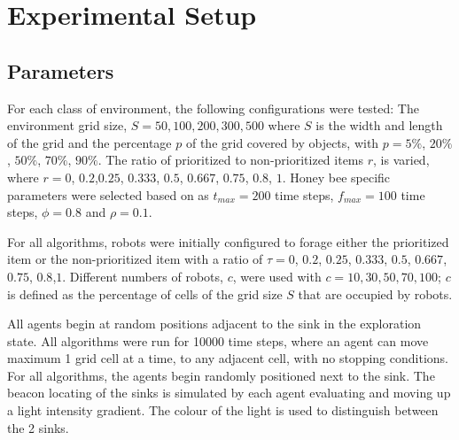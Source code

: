 
\chapter{Experimental Setup}
\label{chap:third}




\section{Parameters}
\label{parameters}

For each class of environment, the following configurations were tested: The environment grid size, $S=50,100,200,300, 500$ where $S$ is the width and length of the grid and the percentage $p$ of the grid covered by objects, with $p= 5\%$, $20\%$, $50\%$, $70\%$, $90\%$. The ratio of prioritized to non-prioritized items $r$, is varied, where $r=0$, $0.2$,$0.25$, $0.333$, $0.5$, $0.667$, $0.75$, $0.8$, $1$. Honey bee specific parameters were selected based on \cite{seeley2009wisdom} as 
$t_{max}=200$ time steps, $f_{max}=100$ time steps, $\phi=0.8$ and $\rho=0.1$.

For all algorithms, robots were initially configured to forage either the prioritized item or the non-prioritized item with a ratio of $\tau=0$, $0.2$, $0.25$, $0.333$, $0.5$, $0.667$, $0.75$, $0.8$,$1$. Different numbers of robots, $c$, were used with $c=10, 30, 50, 70, 100$; $c$ is defined as the percentage of cells of the grid size $S$ that are occupied by robots.

All agents begin at random positions adjacent to the sink in the exploration state. All algorithms were run for 10000 time steps, where an agent can move maximum 1 grid cell at a time, to any adjacent cell, with no stopping conditions. For all algorithms, the agents begin randomly positioned next to the sink. The beacon locating of the sinks is simulated by each agent evaluating and moving up a light intensity gradient. The colour of the light is used to distinguish between the 2 sinks.

